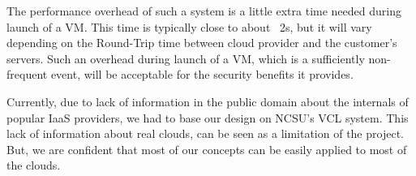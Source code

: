 \documentclass[10pt,twocolumn,pdftex]{article}
\begin{document}
The performance overhead of such a system is a little extra time needed during launch of a VM. This time is typically close to about ~2s, but it will vary depending on the Round-Trip time between cloud provider and the customer's servers. Such an overhead during launch of a VM, which is a sufficiently non-frequent event, will be acceptable for the security benefits it provides. 

Currently, due to lack of information in the public domain about the internals of popular IaaS providers, we had to base our design on NCSU's VCL system. This lack of information about real clouds, can be seen as a limitation of the project. But, we are confident that most of our concepts can be easily applied to most of the clouds.
\nocite{*}
{}

\end{document}

